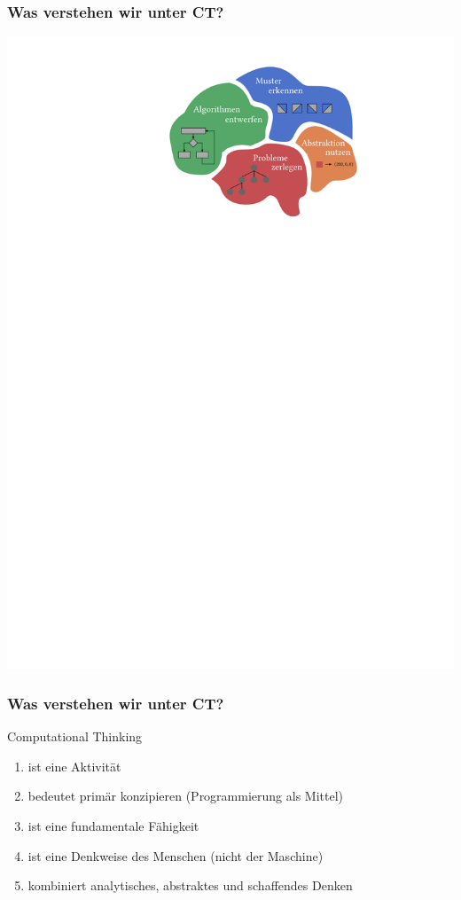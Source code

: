 \documentclass[german,aspectratio=169]{beamer}
\begin{document}
\begin{frame}
	\frametitle{Was verstehen wir unter CT?}
	\begin{center}
		\includegraphics[scale=0.5]{./figs/ct-logo}
	\end{center}
\end{frame}

\begin{frame}
	\frametitle{Was verstehen wir unter CT?}
	Computational Thinking
	\begin{enumerate}[label=$\bullet$]
		\item ist eine Aktivität
		\item bedeutet primär konzipieren (Programmierung als Mittel)
		\item ist eine fundamentale Fähigkeit
		\item ist eine Denkweise des Menschen (nicht der Maschine)
		\item kombiniert analytisches, abstraktes und schaffendes Denken
	\end{enumerate}
\end{frame}
\end{document}
